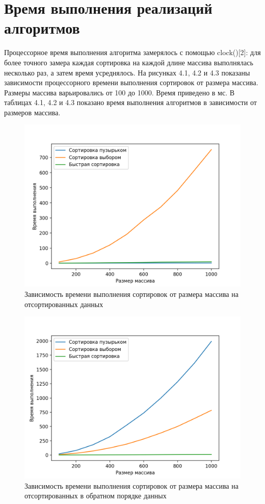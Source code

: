 \documentclass{report}
\begin{document}
\section{Время выполнения реализаций алгоритмов}
Процессорное время выполнения алгоритма замерялось с помощью clock()[2]: для более точного замера каждая сортировка на каждой длине массива выполнялась несколько раз, а затем время усреднялось. 
На рисунках 4.1, 4.2 и 4.3 показаны зависимости процессорного времени выполнения сортировок от размера массива. Размеры массива варьировались от 100 до 1000. Время приведено в мс. В таблицах 4.1, 4.2 и 4.3 показано время выполнения алгоритмов в зависимости от размеров массива.

\begin{figure}[h!p]
	\centering
	\includegraphics[scale = 0.8]{dir.png}
	\caption{Зависимость времени выполнения сортировок от размера массива на отсортированных данных}
	\label{fig:mpr}
\end{figure}

\begin{figure}[h!p]
	\centering
	\includegraphics[scale = 0.8]{undir.png}
	\caption{Зависимость времени выполнения сортировок от размера массива на отсортированных в обратном порядке данных}
	\label{fig:mpr}
\end{figure}
\end{document}
